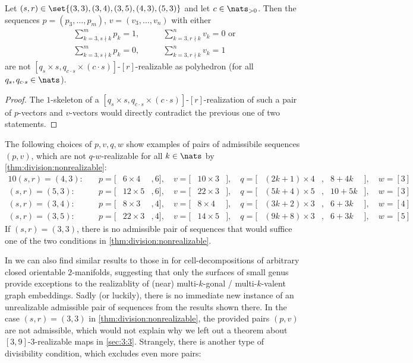\begin{corollary}\label{thm:division:nonrealizable}
  Let $(s, r) \in \set{(3, 3), (3, 4), (3, 5), (4, 3), (5, 3)}$ and let $c \in \nats_{> 0}$. Then the sequences $p = (p_3, \dots, p_m)$, $v = (v_3, \dots, v_n)$ with either
  \begin{align*}
    \sum_{k = 3, s \nmid k}^m p_k = 1, \qquad&\sum_{k = 3, r \nmid k}^n v_k = 0 \text{~or} \\
    \sum_{k = 3, s \nmid k}^m p_k = 0, \qquad&\sum_{k = 3, r \nmid k}^n v_k = 1
  \end{align*}
  are not $[q_s \times s, q_{c \cdot s} \times (c \cdot s)]$-$[r]$-realizable as polyhedron (for all $q_s, q_{c \cdot s} \in \nats$).
\begin{proof}
  The $1$-skeleton of a $[q_s \times s, q_{c \cdot s} \times (c \cdot s)]$-$[r]$-realization of such a pair of $p$-vectors and $v$-vectors would directly contradict the previous one of two statements.
\end{proof}
\end{corollary}

\begin{example}
  The following choices of $p, v, q, w$ show examples of pairs of admissibile sequences $(p, v)$, which are not $q$-$w$-realizable for all $k \in \nats$ by \autoref{thm:division:nonrealizable}:
  \begin{alignat*}{10}
    (s, r) = (4, 3):\quad& p = [& 6 \times 4&, 6], \quad v = [&10 \times 3&], \quad q = [&(2k + 1) \times 4&,{} & 8 + 4k&], \quad w = [3]\\
    (s, r) = (5, 3):\quad& p = [&12 \times 5&, 6], \quad v = [&22 \times 3&], \quad q = [&(5k + 4) \times 5&,{} &10 + 5k&], \quad w = [3]\\
    (s, r) = (3, 4):\quad& p = [& 8 \times 3&, 4], \quad v = [& 8 \times 4&], \quad q = [&(3k + 2) \times 3&,{} & 6 + 3k&], \quad w = [4]\\
    (s, r) = (3, 5):\quad& p = [&22 \times 3&, 4], \quad v = [&14 \times 5&], \quad q = [&(9k + 8) \times 3&,{} & 6 + 3k&], \quad w = [5]
  \end{alignat*}
  If $(s, r) = (3, 3)$, there is no admissible pair of sequences that would suffice one of the two conditions in \autoref{thm:division:nonrealizable}.
\end{example}

In \cite{horvnak1977nearly} we can also find similar results to those in \cite{malkevitch1970properties} for cell-decompositions of arbitrary closed orientable $2$-manifolds, suggesting that only the surfaces of small genus provide exceptions to the realizablity of (near) multi-$k$-gonal / multi-$k$-valent graph embeddings. Sadly (or luckily), there is no immediate new instance of an unrealizable admissible pair of sequences from the results shown there. In the case $(s, r) = (3, 3)$ in \autoref{thm:division:nonrealizable}, the provided pairs $(p, v)$ are not admissible, which would not explain why we left out a theorem about $[3, 9]$-$3$-realizable maps in \autoref{sec:3:3}. Strangely, there is another type of divisibility condition, which excludes even more pairs:

